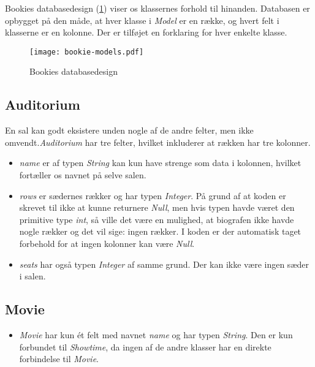 Bookies databasedesign (\ref{class-diagram: bookie-models}) viser os klassernes forhold til hinanden. Databasen er opbygget på den måde, at hver klasse i \textit{Model} er en række, og hvert felt i klasserne er en kolonne. Der er tilføjet en forklaring for hver enkelte klasse.

\begin{figure}[h]
  \centering
  \texttt{[image: bookie-models.pdf]}
  \caption{Bookies databasedesign}
  \label{class-diagram: bookie-models}
\end{figure}

\subsection{Auditorium}

En sal kan godt eksistere unden nogle af de andre felter, men ikke omvendt.\textit{Auditorium} har tre felter, hvilket inkluderer at rækken har tre kolonner.
\begin{itemize}

  \item \textit{name} er af typen \textit{String} kan kun have strenge som data i kolonnen, hvilket fortæller os navnet på selve salen.
  \item \textit{rows} er sædernes rækker og har typen \textit{Integer}. På grund af at koden er skrevet til ikke at kunne returnere \textit{Null}, men hvis typen havde været den primitive type \textit{int}, så ville det være en mulighed, at biografen ikke havde nogle rækker og det vil sige: ingen rækker. I koden er der automatisk taget forbehold for at ingen kolonner kan være \textit{Null}.
  \item \textit{seats} har også typen \textit{Integer} af samme grund. Der kan ikke være ingen sæder i salen.

\end{itemize}

\subsection{Movie}

\begin{itemize}

  \item \textit{Movie} har kun ét felt med navnet \textit{name} og har typen \textit{String}. Den er kun forbundet til \textit{Showtime}, da ingen af de andre klasser har en direkte forbindelse til \textit{Movie}.

\end{itemize}

